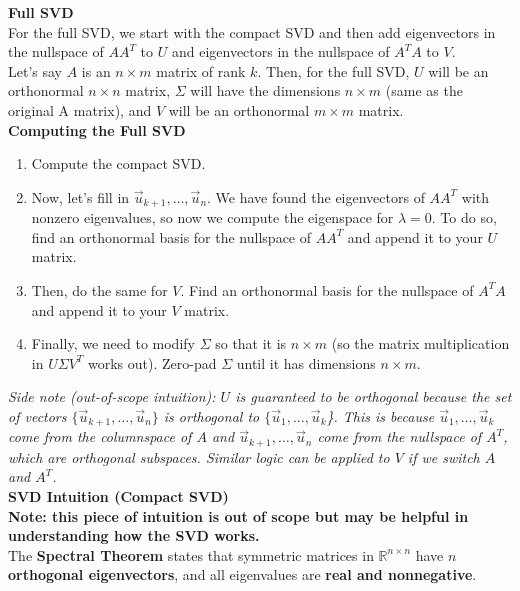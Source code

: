 \textbf{Full SVD} \\
\newline
For the full SVD, we start with the compact SVD and then add eigenvectors in the nullspace of $AA^T$ to $U$ and eigenvectors in the nullspace of $A^TA$ to $V$. \\
\newline
Let's say $A$ is an $n \times m$ matrix of rank $k$. Then, for the full SVD, $U$ will be an orthonormal $n \times n$ matrix, $\Sigma$ will have the dimensions $n \times m$ (same as the original A matrix), and $V$ will be an orthonormal $m \times m$ matrix. \\
\newline
\textbf{Computing the Full SVD}
\begin{enumerate}
    \item Compute the compact SVD.
    \item Now, let's fill in $\vec{u}_{k+1}, \dots, \vec{u}_n$. We have found the eigenvectors of $AA^T$ with nonzero eigenvalues, so now we compute the eigenspace for $\lambda = 0$. To do so, find an orthonormal basis for the nullspace of $AA^T$ and append it to your $U$ matrix.
    \item Then, do the same for $V$. Find an orthonormal basis for the nullspace of $A^T A$ and append it to your $V$ matrix.
    \item Finally, we need to modify $\Sigma$ so that it is $n \times m$ (so the matrix multiplication in $U \Sigma V^T$ works out). Zero-pad $\Sigma$ until it has dimensions $n \times m$.
\end{enumerate}
\textit{Side note (out-of-scope intuition): $U$ is guaranteed to be orthogonal because the set of vectors $\{\vec{u}_{k + 1}, \dots, \vec{u}_n\}$ is orthogonal to $\{\vec{u}_1, \dots, \vec{u}_k$\}. 
This is because $\vec{u}_1, \dots, \vec{u}_k$ come from the columnspace of $A$ and $\vec{u}_{k + 1}, \dots, \vec{u}_n$ come from the nullspace of $A^T$, which are orthogonal subspaces. 
Similar logic can be applied to $V$ if we switch $A$ and $A^T$.} \\
\newline
\textbf{SVD Intuition (Compact SVD)} \\
\textbf{Note: this piece of intuition is out of scope but may be helpful in understanding how the SVD works.} \\
\newline
The \textbf{Spectral Theorem} states that symmetric matrices in $\mathbb{R}^{n\times n}$ have $n$ \textbf{orthogonal eigenvectors}, and all eigenvalues are \textbf{real and nonnegative}. \\
